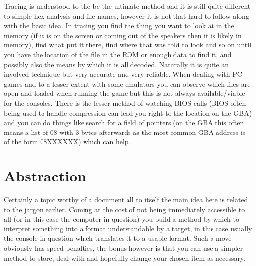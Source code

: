 \documentclass[
]{book}
\begin{document}
Tracing is understood to the be the ultimate method and it is still quite different to simple hex analysis and file names, however it is not that hard to follow along with the basic idea. In tracing you find the thing you want to look at in the memory (if it is on the screen or coming out of the speakers then it is likely in memory), find what put it there, find where that was told to look and so on until you have the location of the file in the ROM or enough data to find it, and possibly also the means by which it is all decoded. Naturally it is quite an involved technique but very accurate and very reliable. When dealing with PC games and to a lesser extent with some emulators you can observe which files are open and loaded when running the game but this is not always available/viable for the consoles. There is the lesser method of watching BIOS calls (BIOS often being used to handle compression can lead you right to the location on the GBA) and you can do things like search for a field of pointers (on the GBA this often means a list of 08 with 3 bytes afterwards as the most common GBA address is of the form 08XXXXXX) which can help.

\hypertarget{abstraction}{%
\section{Abstraction}\label{abstraction}}

Certainly a topic worthy of a document all to itself the main idea here is related to the jargon earlier. Coming at the cost of not being immediately accessible to all (or in this case the computer in question) you build a method by which to interpret something into a format understandable by a target, in this case usually the console in question which translates it to a usable format. Such a move obviously has speed penalties, the bonus however is that you can use a simpler method to store, deal with and hopefully change your chosen item as necessary.
\end{document}
